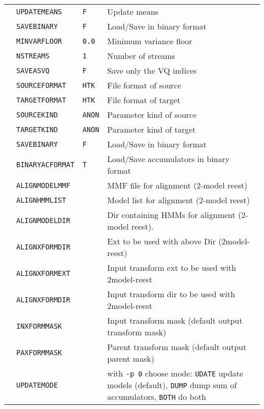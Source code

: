 \newpage
{}

\begin{center}
\tabletail{\hline}
\begin{supertabular}{|p{1.8cm}|l|l|p{6.6cm}|}

  & \texttt{UPDATEMEANS} & \texttt{F} & Update means \\ 
 & \texttt{SAVEBINARY} & \texttt{F} & Load/Save in binary format \\ 
  & \texttt{MINVARFLOOR} & \texttt{0.0} & Minimum variance floor \\ \hline

  & \texttt{NSTREAMS} & \texttt{1} & Number of streams \\ 
  & \texttt{SAVEASVQ} & \texttt{F} & Save only the VQ indices \\ 
 & \texttt{SOURCEFORMAT} & \texttt{HTK} & File format of source \\ 
  & \texttt{TARGETFORMAT} & \texttt{HTK} & File format of target \\ 
  & \texttt{SOURCEKIND} & \texttt{ANON} & Parameter kind of source \\ 
  & \texttt{TARGETKIND} & \texttt{ANON} & Parameter kind of target \\ \hline

  & \texttt{SAVEBINARY} & \texttt{F} & Load/Save in binary format \\ 
  & \texttt{BINARYACFORMAT} & \texttt{T} & Load/Save accumulators in binary format \\ 
  & \texttt{ALIGNMODELMMF} & & MMF file for alignment (2-model reest)  \\ 
  & \texttt{ALIGNHMMLIST}  & & Model list for alignment (2-model reest) \\ 
  & \texttt{ALIGNMODELDIR} & & Dir containing HMMs for alignment (2-model reest).  \\ 
  & \texttt{ALIGNXFORMDIR} & & Ext to be used with above Dir (2model-reest) \\  
  & \texttt{ALIGNXFORMEXT} & & Input transform ext to be used with 2model-reest \\  
  & \texttt{ALIGNXFORMDIR} & & Input transform dir to be used with 2model-reest \\  
  & \texttt{INXFORMMASK} & & Input transform mask (default output transform mask) \\  
  & \texttt{PAXFORMMASK} & & Parent transform mask (default output parent mask) \\  
  & \texttt{UPDATEMODE} & & with \texttt{-p 0} choose mode:
  \texttt{UDATE} update models (default), \texttt{DUMP} dump sum of
  accumulators, \texttt{BOTH} do both\\   
\hline


\end{supertabular}
\end{center}
